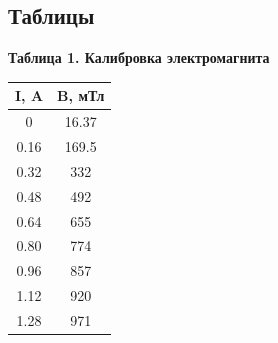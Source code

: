 \documentclass[15pt,a5paper,reqno]{article}
\begin{document}
    \subsection{Таблицы}

    \noindent\hypertarget{table_1}{\textbf{Таблица 1. Калибровка электромагнита}}
    \begin{center}
        \begin{tabular}{|c|c|}
            \hline
            I, A & B, мТл \\ \hline\hline
            0    & 16.37  \\ \hline
            0.16 & 169.5  \\ \hline
            0.32 &  332   \\ \hline
            0.48 &  492   \\ \hline
            0.64 &  655   \\ \hline
            0.80 &  774   \\ \hline
            0.96 &  857   \\ \hline
            1.12 &  920   \\ \hline
            1.28 &  971   \\ \hline   
        \end{tabular}
    \end{center}
\end{document}
